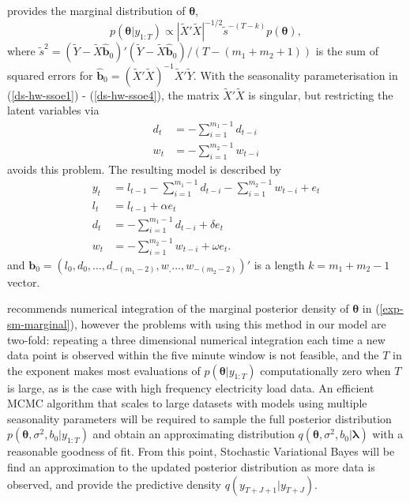 \documentclass[12pt,a4paper]{article}%
\numberwithin{equation}{section}
\begin{document}
\citet{Forbes2000} provides the marginal distribution of $\boldsymbol{\theta}$,
\begin{equation}
\label{exp-sm-marginal}
p(\boldsymbol{\theta} | y_{1:T}) \propto \left| \widetilde{X}' \widetilde{X} \right|^{-1/2} \tilde{s}^{-(T-k)} p(\boldsymbol{\theta}),
\end{equation}
where $\tilde{s}^2 = (\widetilde{Y} - \widetilde{X}\hat{\textbf{b}}_0)'(\widetilde{Y} - \widetilde{X}\hat{\textbf{b}}_0) / (T - (m_1 + m_2 + 1))$ is the sum of squared errors for $\hat{\textbf{b}}_0 = (\widetilde{X}'\widetilde{X})^{-1}\widetilde{X}'\widetilde{Y}$.
With the seasonality parameterisation in (\ref{ds-hw-ssoe1}) - (\ref{ds-hw-ssoe4}), the matrix $\widetilde{X}' \widetilde{X}$ is singular, but restricting the latent variables via
\begin{align}
d_t &= - \sum_{i=1}^{m_1-1} d_{t-i} \\
w_t &= - \sum_{i=1}^{m_2-1} w_{t-i}
\end{align}
avoids this problem. The resulting model is described by
\begin{align}
y_t &= l_{t-1} - \sum_{i = 1}^{m_1 - 1}d_{t-i} - \sum_{i = 1}^{m_2 - 1}w_{t-i} + e_t \label{ds-hw-rp1} \\
l_t &= l_{t-1} + \alpha e_t \label{ds-hw-rp2} \\
d_t &= - \sum_{i = 1}^{m_1 - 1}d_{t-i} + \delta e_t \label{ds-hw-rp3} \\
w_t &= - \sum_{i = 1}^{m_2 - 1}w_{t-i} + \omega e_t \label{ds-hw-rp4}.
\end{align}
and $\textbf{b}_0 = (l_0, d_0, \dots, d_{-(m_1 - 2)}, w_, \dots, w_{-(m_2 - 2)})'$ is a length $k = m_1 + m_2 - 1$ vector.

\citet{Forbes2000} recommends numerical integration of the marginal posterior density of $\boldsymbol{\theta}$ in (\ref{exp-sm-marginal}), however the problems with using this method in our model are two-fold: repeating a three dimensional numerical integration each time a new data point is observed within the five minute window is not feasible, and the $T$ in the exponent makes most evaluations of $p(\boldsymbol{\theta}  | y_{1:T})$ computationally zero when $T$ is large, as is the case with high frequency electricity load data. An efficient MCMC algorithm that scales to large datasets with models using multiple seasonality parameters will be required to sample the full posterior distribution $p(\boldsymbol{\theta} , \sigma^2, b_0 | y_{1:T})$ and obtain an approximating distribution $q(\boldsymbol{\theta}, \sigma^2, b_0 | \boldsymbol{\lambda})$ with a reasonable goodness of fit. From this point, Stochastic Variational Bayes will be find an approximation to the updated posterior distribution as more data is observed, and provide the predictive density $q(y_{T+J+1} | y_{T+J})$.
\end{document}
